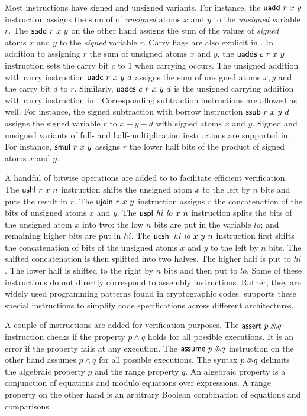 Most \cryptoline instructions have signed and unsigned variants. For
instance, the $\clUAdd\ r\ x\ y$ instruction assigns the sum of
of \emph{unsigned} atoms $x$ and $y$ to the \emph{unsigned} variable
$r$. The $\clSAdd\ r\ x\ y$ on the other hand assigns the sum of the
values of \emph{signed} atoms $x$ and $y$ to the \emph{signed}
variable $r$. Carry flags are also explicit in \cryptoline. In
addition to assigning $r$ the sum of unsigned atoms $x$ and $y$, the
$\clUAdds\ c\ r\ x\ y$ instruction sets the carry bit $c$ to $1$ when
carrying occurs. The unsigned addition with carry instruction
$\clUAdc\ r\ x\ y\ d$ assigns the sum of unsigned atoms $x, y$ and the
carry bit $d$ to $r$. Similarly, $\clUAdcs\ c\ r\ x\ y\ d$ is the
unsigned carrying addition with carry instruction in \cryptoline.
Corresponding subtraction instructions are allowed as well. For
instance, the signed subtraction with borrow instruction $\clSSub\ r\
x\ y\ d$ assigns the signed variable $r$ to $x - y - d$ with signed
atoms $x$ and $y$. Signed and unsigned variants of full- and
half-multiplication instructions are supported in \cryptoline. For
instance, $\clSMul\ r\ x\ y$ assigns $r$ the lower half bits of the
product of signed atoms $x$ and $y$.

A handful of bitwise operations are added to \cryptoline to facilitate
efficient verification. The $\clUShl\ r\ x\ n$ instruction shifts the
unsigned atom $x$ to the left by $n$ bits and puts the result in
$r$. The $\clUJoin\ r\ x\ y$ instruction assigns $r$ the concatenation
of the bits of unsigned atoms $x$ and $y$. The $\clUSplit\
\mathit{hi}\ \mathit{lo}\ x\ n$ instruction splits the bits of the
unsigned atom $x$ into two: the low $n$ bits are put in the variable
$\mathit{lo}$; and remaining higher bits are put in $\mathit{hi}$.
The $\clUCShl\ \mathit{hi}\ \mathit{lo}\ x\ y\ n$ instruction first
shifts the concatenation of bits of the unsigned atoms $x$ and $y$ to
the left by $n$ bits. The shifted concatenation is then splitted into
two halves. The higher half is put to $\mathit{hi}$. The lower half is
shifted to the right by $n$ bits and then put to $\mathit{lo}$. Some
of these instructions do not directly correspond to assembly
instructions. Rather, they are widely used programming patterns found
in cryptographic codes. \cryptoline supports these special
instructions to simplify code specifications across different
architectures.

A couple of \cryptoline instructions are added for verification
purposes. The $\clAssert\ p \clConj q$ instruction checks if the
property $p \wedge q$ holds for all possible executions. It is an
error if the property fails at any execution. The $\clAssume\ p
\clConj q$ instruction on the other hand assumes $p \wedge q$ for all
possible executions. The syntax $p \wedge\!\!\!\!\wedge q$ delimits the algebraic
property $p$ and the range property $q$. An algebraic property is a
conjunction of equations and modulo equations over expressions. A
range property on the other hand is an arbitrary Boolean combination
of equations and comparisons.

